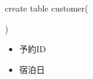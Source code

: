 \documentclass[../main]{subfiles}
\begin{document}
    \begin{screen}
        create table customer(




        )
    \end{screen}


\begin{itemize}
    \item 予約ID 
    \item 宿泊日
\end{itemize}
\end{document}

